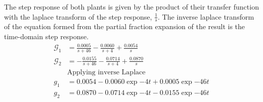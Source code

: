 The step response of both plants is given by the product of their transfer function with the laplace transform of the step response, $\frac{1}{s}$. The inverse laplace transform of the equation formed from the partial fraction expansion of the result is the time-domain step response.
\begin{align*}
	\mathcal{G}_1 &= \frac{0.0005}{s+46}- \frac{0.0060}{s+4}+\frac{0.0054}{s}\\
	\mathcal{G}_2 &= -\frac{0.0155}{s+46}- \frac{0.0714}{s+4}+\frac{0.0870}{s}\\
&\text{Applying inverse Laplace}\\
g_1&= 0.0054-{0.0060}\exp{-4t}+{0.0005}\exp{-46t}\\
g_2&= 0.0870- {0.0714}\exp{-4t}-{0.0155}\exp{-46t}
\end{align*}